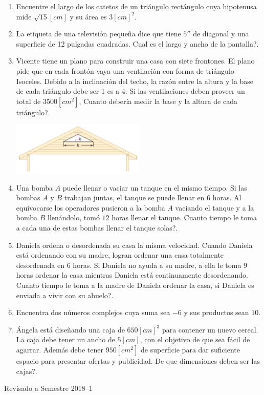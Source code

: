 \documentclass[letter,11pt]{article}
\newcommand\0{\mathbf{0}}
\begin{document}
\begin{enumerate}
\item Encuentre el largo de los catetos de un tri\'angulo rect\'angulo cuya hipotenusa mide $\sqrt{15}[cm]$ y su \'area es $3[cm]^2$.
\item La etiqueta de una televisi\'on pequeña dice que tiene $5''$ de diagonal y una superficie de 12 pulgadas cuadradas. \textquestiondown Cual es el largo y ancho de la pantalla?.
\item Vicente tiene un plano para construir una casa con siete frontones. El plano pide que en cada front\'on vaya una ventilaci\'on con forma de tri\'angulo Isoceles. Debido a la inclinaci\'on del techo, la raz\'on entre la altura y la base de cada tri\'angulo debe ser 1 es a 4. Si las ventilaciones deben proveer un total de $3500[cm^2]$, \textquestiondown Cuanto deber\'ia medir la base y la altura de cada tri\'angulo?.
\begin{center}
\includegraphics[width=0.5\textwidth]{./p1.jpg}
\end{center}
\item Una bomba $A$ puede llenar o vaciar un tanque en el mismo tiempo. Si las bombas $A$ y $B$ trabajan juntas, el tanque se puede llenar en $6$ horas. Al equivocarse los operadores pusieron a la bomba $A$ vaciando el tanque y a la bomba $B$ llen\'andolo, tom\'o $12$ horas llenar el tanque. \textquestiondown Cuanto tiempo le toma a cada una de estas bombas llenar el tanque solas?.

 \item Daniela ordena o desordenada su casa la misma velocidad. Cuando Daniela est\'a ordenando con su madre, logran ordenar una casa totalmente desordenada en $6$ horas. Si Daniela no ayuda a su madre, a ella le toma $9$ horas ordenar la casa mientras Daniela est\'a continuamente desordenando. \textquestiondown Cuanto tiempo le toma a la madre de Daniela ordenar la casa, si Daniela es enviada a vivir con su abuelo?.
 
 \item Encuentra dos n\'umeros complejos cuya suma sea $-6$ y sus productos sean $10$.
 
 \item \'Angela est\'a diseñando una caja de $650[cm]^3$ para contener un nuevo cereal. La caja debe tener un ancho de $5[cm]$, con el objetivo de que sea f\'acil de agarrar. Adem\'as debe tener $950[cm^2]$ de superficie para dar suficiente espacio para presentar  ofertas y publicidad. \textquestiondown De que dimensiones deben ser las cajas?.

\end{enumerate}

\vfill
\hfill Revisado a Semestre 2018--1
\end{document}
